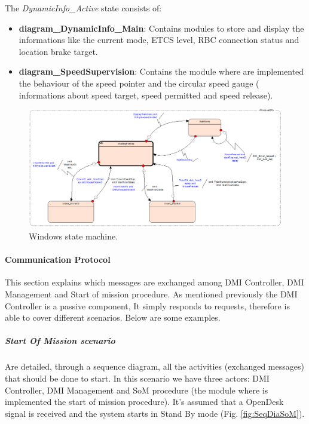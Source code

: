   The \textit{ DynamicInfo\_Active} state consists of:\\
  
  \begin{itemize}
  	\item \textbf{diagram\_DynamicInfo\_Main}: Contains modules to store and display the informations like the current mode, ETCS level, RBC connection status and location brake target.
  	\item \textbf{diagram\_SpeedSupervision}: Contains the module where are implemented the behaviour of the speed pointer and the circular speed gauge ( informations about speed target, speed permitted and speed release).
  \end{itemize}
  
  \begin{figure}
  	\centering
  	\includegraphics[width=\textwidth]{images/WindowSM}
  	\caption{Windows state machine.}\label{fig:win_sm}
  \end{figure}
  
\paragraph{Communication Protocol}
This section explains which messages are exchanged among DMI Controller, DMI Management and Start of mission procedure. As mentioned previously the DMI Controller is a passive component, It simply responds to requests, therefore is able to cover different scenarios. Below are some examples.
  
  \subparagraph{ Start Of Mission scenario} Are detailed, through a sequence diagram, all the activities (exchanged messages) that should be done to start. In this scenario we have three actors: DMI Controller, DMI Management and SoM procedure (the module where is implemented the start of mission procedure). It's assumed that a OpenDesk signal is received and the system starts in Stand By mode (Fig. \ref{fig:SeqDiaSoM}).
 
